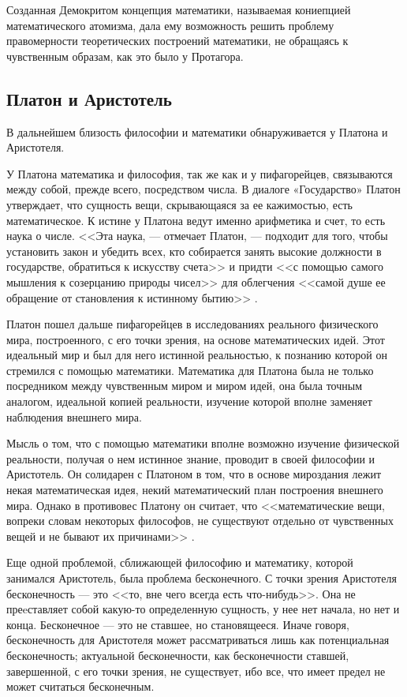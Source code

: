 \documentclass[a4page]{article}
\begin{document}
Созданная Демокритом концепция математики, называемая кониепцией математического атомизма,
дала ему возможность решить проблему правомерности теоретических построений математики,
не обращаясь к чувственным образам, как это было у Протагора.

\subsection{Платон и Аристотель}
В дальнейшем близость философии и математики обнаруживается у Платона и Аристотеля.

У Платона математика и философия, так же как и у пифагорейцев,
связываются между собой, прежде всего, посредством числа.
В диалоге «Государство» Платон утверждает, что сущность вещи,
скрывающаяся за ее кажимостью, есть математическое.
К истине у Платона ведут именно арифметика и счет, то есть наука о числе.
<<Эта наука, --- отмечает Платон, --- подходит для того,
чтобы установить закон и убедить всех,
кто собирается занять высокие должности в государстве, обратиться к искусству счета>>
и придти <<с помощью самого мышления к созерцанию природы чисел>>
для облегчения <<самой душе ее обращение от становления к истинному бытию>> \cite{plato-compilation}.

Платон пошел дальше пифагорейцев в исследованиях реального физического мира,
построенного, с его точки зрения, на основе математических идей.
Этот идеальный мир и был для него истинной реальностью,
к познанию которой он стремился с помощью математики.
Математика для Платона была не только посредником между чувственным миром и миром идей,
она была точным аналогом, идеальной копией реальности,
изучение которой вполне заменяет наблюдения внешнего мира.

Мысль о том, что с помощью математики вполне возможно изучение физической реальности,
получая о нем истинное знание, проводит в своей философии и Аристотель.
Он солидарен с Платоном в том, что в основе мироздания лежит некая математическая идея,
некий математический план построения внешнего мира.
Однако в противовес Платону он считает,
что <<математические вещи, вопреки словам некоторых философов,
не существуют отдельно от чувственных вещей и не бывают их причинами>> \cite{aristotle-metaphysics}.

Еще одной проблемой, сближающей философию и математику,
которой занимался Аристотель, была проблема бесконечного.
С точки зрения Аристотеля бесконечность --- это <<то, вне чего всегда есть что-нибудь>>.
Она не преeставляет собой какую-то определенную сущность, у нее нет начала, но нет и конца.
Бесконечное --- это не ставшее, но становящееся.
Иначе говоря, бесконечность для Аристотеля может рассматриваться лишь как потенциальная бесконечность;
актуальной бесконечности, как бесконечности ставшей, завершенной,
с его точки зрения, не существует, ибо все, что имеет предел не может считаться бесконечным.
\end{document}

